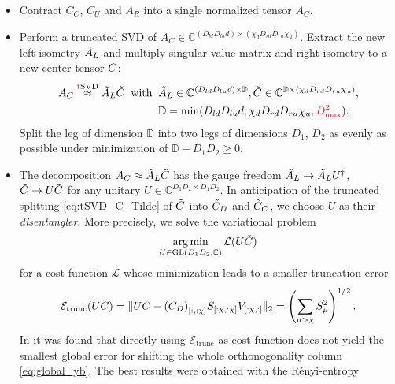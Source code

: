 \begin{itemize}
	\item[\text{(YB1)}] Contract $C_C$, $C_U$ and $A_R$ into a single normalized tensor $A_C$.
	\item[\text{(YB2)}] Perform a truncated SVD of $A_C \in \mathbb{C}^{(D_{ld} D_{lu} d) \times (\chi_d D_{rd} D_{ru} \chi_u)}$. Extract the new left isometry $\Tilde{A}_L$ and multiply singular value matrix and right isometry to a new center tensor $\Tilde{C}$:
	\begin{align}
	\begin{split}
		A_C \overset{\text{\textcolor{red}{t}SVD}}{\approx} \Tilde{A}_L \Tilde{C} 
		\:\text{ with }\: 
		&\Tilde{A}_L \in \mathbb{C}^{(D_{ld} D_{lu} d) \times \mathbb{D}}, 
		\Tilde{C} \in \mathbb{C}^{\mathbb{D} \times (\chi_d D_{rd} D_{ru} \chi_u)}, \\
		&\mathbb{D} = \text{min}(D_{ld} D_{lu} d, \chi_d D_{rd} D_{ru} \chi_u, \textcolor{red}{D_{\text{max}}^2}).
	\end{split}
	\end{align}
		Split the leg of dimension $\mathbb{D}$ into two legs of dimensions $D_1$, $D_2$ as evenly as possible under minimization of $\mathbb{D} - D_1 D_2 \geq 0$.
	\item[\text{(YB3)}] The decomposition $A_C \approx \Tilde{A}_L \Tilde{C}$ has the gauge freedom $\Tilde{A}_L \rightarrow \Tilde{A}_L U^{\dagger}$, $\Tilde{C} \rightarrow U \Tilde{C}$ for any unitary $U \in \mathbb{C}^{D_1D_2 \times D_1D_2}$. In anticipation of the truncated splitting \eqref{eq:tSVD_C_Tilde} of $\Tilde{C}$ into $\Tilde{C}_D$ and $\Tilde{C}_C$, we choose $U$ as their \textit{disentangler}. More precisely, we solve the variational problem
	\begin{equation} \label{eq:disentangling}
		\operatorname*{arg\,min}_{U \in \text{GL}(D_1D_2, \mathbb{C})} \mathcal{L}(U \Tilde{C})
	\end{equation}
	for a cost function $\mathcal{L}$ whose minimization leads to a smaller truncation error 
	\begin{equation}
		\mathcal{E}_{\text{trunc}} (U \Tilde{C})
		= 
		\Vert U\Tilde{C} - {(\Tilde{C}_D)}_{[:, :\chi]} S_{[:\chi, :\chi]} V_{[:\chi, :]} \Vert_2 
		= 
		\left( \sum_{\mu > \chi} S_{\mu}^2 \right)^{1/2}.
	\end{equation} 
	In \cite{sappler2025diagonal} it was found that directly using $\mathcal{E}_{\text{trunc}}$ as cost function does not yield the smallest global error for shifting the whole orthonogonality column \eqref{eq:global_yb}. The best results were obtained with the Rényi-entropy 

\end{itemize}
